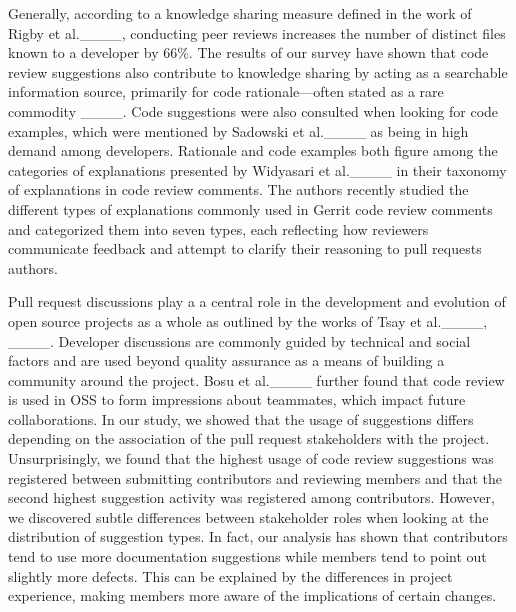 Generally, according to a knowledge sharing measure defined in the work of Rigby et al.____, conducting peer reviews increases the number of distinct files known to a developer by  66\%. 
The results of our survey have shown that code review suggestions also contribute to knowledge sharing by acting as a searchable information source, primarily for code rationale—often stated as a rare commodity ____.
Code suggestions were also consulted when looking for code examples, which were mentioned by Sadowski et al.____ as being  in high demand among developers.
Rationale and code examples both figure among the categories of explanations presented by Widyasari et al.____ in their taxonomy of explanations in code review comments. 
The authors recently studied the different types of explanations commonly used in Gerrit code review comments and categorized them into seven types, each reflecting how reviewers communicate feedback and attempt to clarify their reasoning to pull requests authors.

Pull request discussions play a a central role in the development and evolution of open source projects as a whole as outlined by the works of Tsay et al.____, ____.
Developer discussions are commonly guided by technical and social factors and are used beyond quality assurance as a means of building a community around the project.
Bosu et al.____ further found that code review is used in OSS to form impressions about teammates, which impact future collaborations.
In our study, we showed that the usage of suggestions differs depending on the association of the pull request stakeholders with the project.
Unsurprisingly, we found that the highest usage of code review suggestions was registered between submitting contributors and reviewing members and that the second highest suggestion activity was registered among contributors.
However, we discovered subtle differences between stakeholder roles when looking at the distribution of suggestion types.
In fact, our analysis has shown that contributors tend to use more documentation suggestions  while members tend to point out slightly more defects. 
This can be explained by the differences in project experience, making members more aware of the implications of certain changes.

